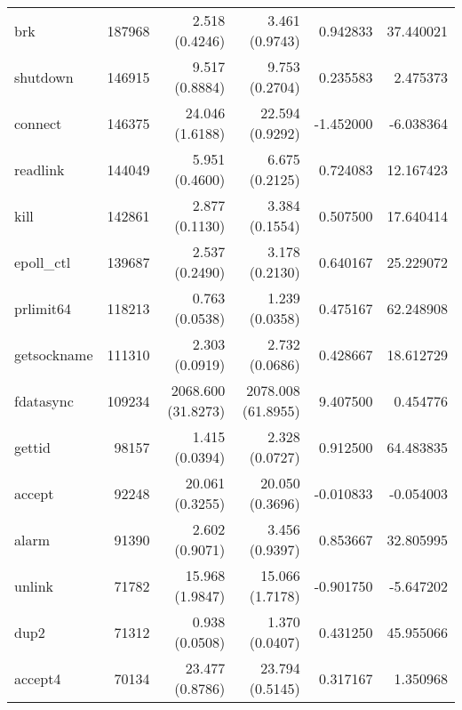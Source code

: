 \begin{longtable}{>{\ttfamily}lrrrrr}
                            brk &     187968 &           2.518 (0.4246) &           3.461 (0.9743) &        0.942833 &    37.440021 \\
                       shutdown &     146915 &           9.517 (0.8884) &           9.753 (0.2704) &        0.235583 &     2.475373 \\
                        connect &     146375 &          24.046 (1.6188) &          22.594 (0.9292) &       -1.452000 &    -6.038364 \\
                       readlink &     144049 &           5.951 (0.4600) &           6.675 (0.2125) &        0.724083 &    12.167423 \\
                           kill &     142861 &           2.877 (0.1130) &           3.384 (0.1554) &        0.507500 &    17.640414 \\
                     epoll\_ctl &     139687 &           2.537 (0.2490) &           3.178 (0.2130) &        0.640167 &    25.229072 \\
                      prlimit64 &     118213 &           0.763 (0.0538) &           1.239 (0.0358) &        0.475167 &    62.248908 \\
                    getsockname &     111310 &           2.303 (0.0919) &           2.732 (0.0686) &        0.428667 &    18.612729 \\
                      fdatasync &     109234 &       2068.600 (31.8273) &       2078.008 (61.8955) &        9.407500 &     0.454776 \\
                         gettid &      98157 &           1.415 (0.0394) &           2.328 (0.0727) &        0.912500 &    64.483835 \\
                         accept &      92248 &          20.061 (0.3255) &          20.050 (0.3696) &       -0.010833 &    -0.054003 \\
                          alarm &      91390 &           2.602 (0.9071) &           3.456 (0.9397) &        0.853667 &    32.805995 \\
                         unlink &      71782 &          15.968 (1.9847) &          15.066 (1.7178) &       -0.901750 &    -5.647202 \\
                           dup2 &      71312 &           0.938 (0.0508) &           1.370 (0.0407) &        0.431250 &    45.955066 \\
                        accept4 &      70134 &          23.477 (0.8786) &          23.794 (0.5145) &        0.317167 &     1.350968 \\

\end{longtable}
